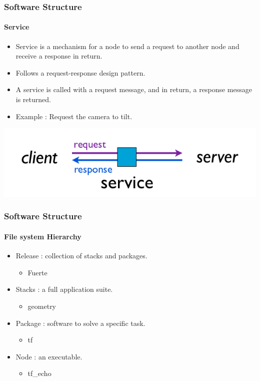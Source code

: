 \documentclass{beamer}
\begin{document}
\begin{frame}
\frametitle{Software Structure}
\framesubtitle{Service}

\begin{itemize}
  \item Service is a mechanism for a node to send a request to another node and receive a response in return.
  \item Follows a request-response design pattern.
  \item A service is called with a request message, and in return, a response message is returned.
  \item Example : Request the camera to tilt.
\end{itemize}

\begin{center}
  \includegraphics[width=.6\textwidth]{service}
\end{center}
\end{frame}

\begin{frame}
\frametitle{Software Structure}
\framesubtitle{File system Hierarchy}

\begin{itemize}
  \item Release : collection of stacks and packages.
  \begin{itemize}
    \item Fuerte
  \end{itemize}
  \item Stacks : a full application suite.
  \begin{itemize}
    \item geometry
  \end{itemize}
  \item Package : software to solve a specific task.
  \begin{itemize}
    \item tf
  \end{itemize}
  \item Node : an executable.
  \begin{itemize}
    \item tf\_echo
  \end{itemize}
\end{itemize}

\end{frame}
\end{document}
